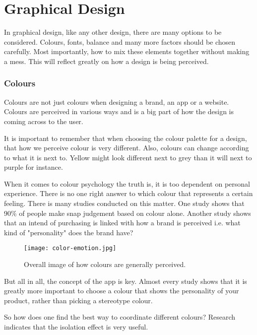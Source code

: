 \section{Graphical Design}\label{GraphicalDesign}
In graphical design, like any other design, there are many options to be considered. Colours, fonts, balance and many more factors should be chosen carefully. Most importantly, how to mix these elements together without making a mess. 
This will reflect greatly on how a design is being perceived. \cite{ColorMeaning}

\subsubsection{Colours}\label{Colours}

Colours are not just colours when designing a brand, an app or a website. Colours are perceived in various ways and is a big part of how the design is coming  across to the user. \cite{ColorMeaning}

It is important to remember that when choosing the colour palette for a design, that how we perceive colour is very different. Also, colours can change according to what it is next to. Yellow might look different next to grey than it will next to purple for instance. \cite{Colour}

When it comes to colour psychology the truth is, it is too dependent on personal experience. There is no one right answer to which colour that represents a certain feeling. \cite{ColorMeaning}
There is many studies conducted on this matter. 
One study shows that 90\% of people make snap judgement based on colour alone. \cite{ColorMeaning} Another study shows that an intend of purchasing is linked with how a brand is perceived i.e. what kind of "personality" does the brand have?\cite{ColorMeaning}

\begin{figure}[H]
\centering
\texttt{[image: color-emotion.jpg]}
\caption{Overall image of how colours are generally perceived.} \cite{ColorMeaning}
\end{figure}

But all in all, the concept of the app is key. Almost every study shows that it is greatly more important to choose a colour that shows the personality of your product, rather than picking a stereotype colour. \cite{ColorMeaning}

So how does one find the best way to coordinate different colours? Research indicates that the isolation effect is very useful.

